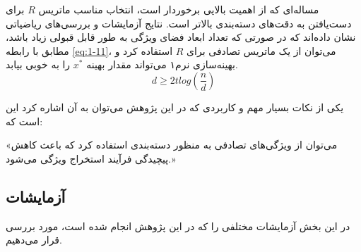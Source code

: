 \documentclass[12pt,twocolumn]{article}
\begin{document}
مساله‌ای که از اهمیت بالایی برخوردار است، انتخاب مناسب ماتریس $R$ برای دست‌یافتن به دقت‌های دسته‌بندی بالاتر است. نتایج آزمایشات و بررسی‌های ریاضیاتی نشان داده‌اند که در صورتی که تعداد ابعاد فضای ویژگی به طور قابل قبولی زیاد باشد، مطابق با رابطه \eqref{eq:1-11}، می‌توان از یک ماتریس تصادفی برای $R$ استفاده کرد و بهینه‌سازی نرم۱ می‌تواند مقدار بهینه $x^*$ را به خوبی بیابد. 
\begin{equation}
d \ge 2t log(\frac{n}{d})
\label{eq:1-11}
\end{equation}

یکی از نکات بسیار مهم و کاربردی که در این پژوهش می‌توان به آن اشاره کرد این است که:
\begin{center}
«می‌توان از ویژگی‌های تصادفی به منظور دسته‌بندی استفاده کرد که باعث کاهش پیچیدگی فر‌آیند استخراج ویژگی می‌شود.»
\end{center}

\subsection{آزمایشات}

در این بخش آزمایشات مختلفی را که در این پژوهش انجام شده است، مورد بررسی قرار می‌دهیم.
\end{document}
